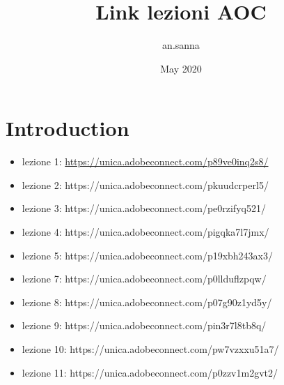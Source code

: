 \documentclass{article}
\title{Link lezioni AOC}
\author{an.sanna }
\date{May 2020}
\begin{document}
\maketitle

\section{Introduction}
\begin{itemize}
\item lezione 1: \url{https://unica.adobeconnect.com/p89ve0inq2s8/}\\
\item lezione 2: https://unica.adobeconnect.com/pkuudcrperl5/\\
\item lezione 3: https://unica.adobeconnect.com/pe0rzifyq521/\\
\item lezione 4: https://unica.adobeconnect.com/pigqka7l7jmx/\\
\item lezione 5: https://unica.adobeconnect.com/p19xbh243ax3/\\
\item lezione 7: https://unica.adobeconnect.com/p0llduflzpqw/\\
\item lezione 8: https://unica.adobeconnect.com/p07g90z1yd5y/\\
\item lezione 9: https://unica.adobeconnect.com/pin3r7l8tb8q/\\
\item lezione 10: https://unica.adobeconnect.com/pw7vzxxu51a7/\\
\item lezione 11: https://unica.adobeconnect.com/p0zzv1m2gvt2/\\
\end{itemize}
\end{document}
